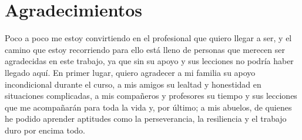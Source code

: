\chapter{Agradecimientos}
Poco a poco me estoy convirtiendo en el profesional que quiero llegar a ser, y el camino que estoy recorriendo para ello está lleno de personas que merecen ser agradecidas en este trabajo, ya que sin su apoyo y sus lecciones no podría haber llegado aquí. En primer lugar, quiero agradecer a mi familia su apoyo incondicional durante el curso, a mis amigos su lealtad y honestidad en situaciones complicadas, a mis compañeros y profesores su tiempo y sus lecciones que me acompañarán para toda la vida y, por último; a mis abuelos, de quienes he podido aprender aptitudes como la perseverancia, la resiliencia y el trabajo duro por encima todo.

\newpage
\thispagestyle{empty}
\hspace*{0.5cm}
\newpage